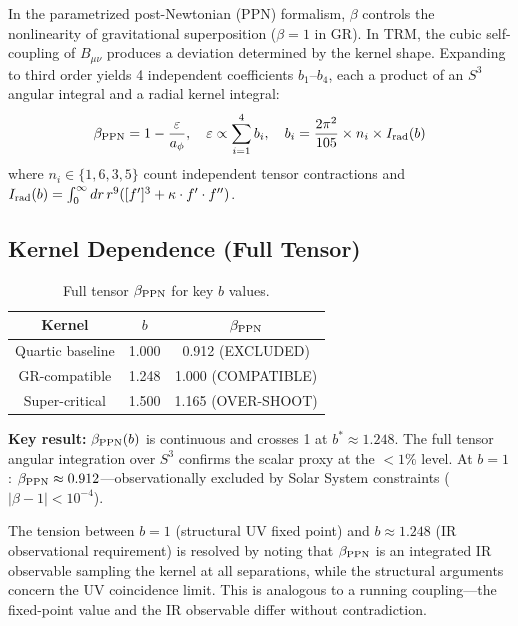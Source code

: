 \documentclass[12pt]{article}
\begin{document}
In the parametrized post-Newtonian (PPN) formalism, $\beta$ controls the nonlinearity of gravitational superposition ($\beta=1$ in GR). In TRM, the cubic self-coupling of $B_{\mu\nu}$ produces a deviation determined by the kernel shape. Expanding to third order yields 4 independent coefficients $b_1$--$b_4$, each a product of an $S^3$ angular integral and a radial kernel integral:
\begin{equation}
\beta_{\rm PPN} = 1 - \frac{\varepsilon}{a_\phi},\quad
\varepsilon \propto \sum_{i=1}^4 b_i,\quad
b_i = \frac{2\pi^2}{105}\times n_i \times I_{\rm rad}(b)
\label{eq:beta}
\end{equation}
where $n_i \in \{1,6,3,5\}$ count independent tensor contractions and $I_{\rm rad}(b) = \int_0^\infty dr\, r^9([f']^3 + \kappa\cdot f'\cdot f'')$.

\subsection{Kernel Dependence (Full Tensor)}

\begin{table}[h]
\centering
\begin{tabular}{c|c|c}
Kernel & $b$ & $\beta_{\rm PPN}$ \\
\midrule
Quartic baseline & 1.000 & 0.912 \quad (EXCLUDED) \\
GR-compatible & 1.248 & 1.000 \quad (COMPATIBLE) \\
Super-critical & 1.500 & 1.165 \quad (OVER-SHOOT) \\
\end{tabular}
\caption{Full tensor $\beta_{\rm PPN}$ for key $b$ values.}
\label{tab:beta}
\end{table}

\textbf{Key result:} $\beta_{\rm PPN}(b)$ is continuous and crosses 1 at $b^* \approx 1.248$. The full tensor angular integration over $S^3$ confirms the scalar proxy at the $<1\%$ level. At $b=1$: $\beta_{\rm PPN} \approx 0.912$---observationally excluded by Solar System constraints ($|\beta-1| < 10^{-4}$).

The tension between $b=1$ (structural UV fixed point) and $b\approx 1.248$ (IR observational requirement) is resolved by noting that $\beta_{\rm PPN}$ is an integrated IR observable sampling the kernel at all separations, while the structural arguments concern the UV coincidence limit. This is analogous to a running coupling---the fixed-point value and the IR observable differ without contradiction.
\end{document}
